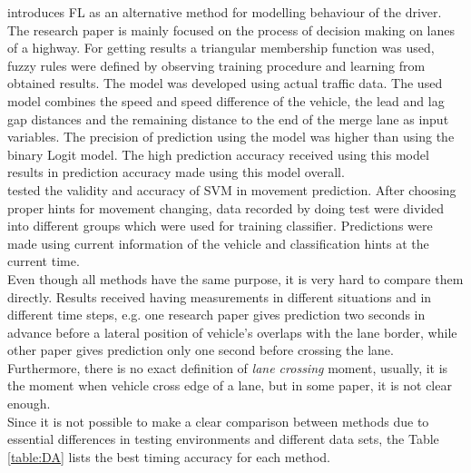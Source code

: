 \cite{Fuzz} introduces \gls{FL} as an alternative method for modelling behaviour of the driver. The research paper is mainly focused on the process of decision making on lanes of a highway. For getting results a triangular membership function was used, fuzzy rules were defined by observing training procedure and learning from obtained results. The model was developed using actual traffic data. The used model combines the speed and speed difference of the vehicle, the lead and lag gap distances and the remaining distance to the end of the merge lane as input variables. The precision of prediction using the model was
higher than using the binary Logit model. The high prediction accuracy received using this model results in prediction accuracy made using this model overall. \\
\cite{VectMash} tested the validity and  accuracy of \gls{SVM} in movement prediction. After choosing proper hints for movement changing, data recorded by doing test were divided into different groups which were used for training classifier. Predictions were made using current information of the vehicle and classification hints at the current time. \\
Even though all methods have the same purpose, it is very hard to compare them directly. Results received having measurements in different situations and in different time steps, e.g. one research paper gives prediction two seconds in advance before a lateral position of vehicle’s overlaps with the lane border, while other paper gives prediction only one second before crossing the lane. Furthermore, there is no exact definition of \textit{lane crossing} moment, usually, it is the moment when vehicle cross edge of a lane, but in some paper, it is not clear enough. \\
Since it is not possible to make a clear comparison between methods due to essential differences in testing environments and different data sets, the Table \ref{table:DA} lists the best timing accuracy for each method. \\

